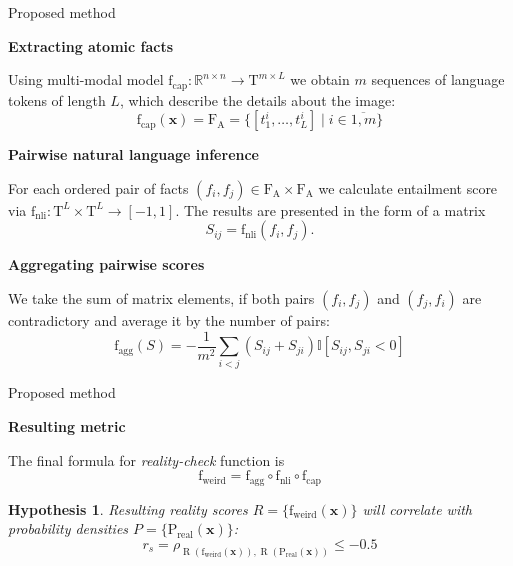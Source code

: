 \documentclass{beamer}
\newtheorem{hyp}{Hypothesis}
\begin{document}
\begin{frame}{Proposed method}


\textbf{Extracting atomic facts}

Using multi-modal model $\text{f}_\text{cap}: \mathbb{R}^{n\times n} \to \mathrm{T}^{m\times L}$ we obtain $m$ sequences of language tokens of length $L$, which describe the details about the image:
\[\text{f}_\text{cap}(\textbf{x}) = \mathrm{F}_\text{A} = \{[t^i_1, \dots, t^i_L]\;|\; i \in \overline{1, m} \} \]

\textbf{Pairwise natural language inference}

For each ordered pair of facts $(f_i, f_j) \in \mathrm{F}_\text{A} \times \mathrm{F}_\text{A}$ we calculate entailment score via $\text{f}_\text{nli}: \mathrm{T}^{L}\times \mathrm{T}^{L} \to [-1, 1]$.
The results are presented in the form of a matrix
\[S_{ij} = \text{f}_\text{nli}(f_i, f_j). \]

\textbf{Aggregating pairwise scores}

We take the sum of matrix elements, if both pairs $(f_i, f_j)$ and $(f_j, f_i)$ are contradictory and average it by the number of pairs:
\[\text{f}_\text{agg} (S) = - \dfrac{1}{m^2} \sum\limits_{i < j} (S_{ij} + S_{ji}) \mathbb{I} [S_{ij}, S_{ji} < 0] \]

\end{frame}

\begin{frame}{Proposed method}

\textbf{Resulting metric}

The final formula for \textit{reality-check} function is \[\text{f}_\text{weird} = \text{f}_\text{agg} \circ \text{f}_\text{nli} \circ \text{f}_\text{cap}\]

\begin{hyp}
Resulting reality scores $R = \{\text{f}_\text{weird}(\textbf{x})\}$ will correlate with probability densities $P = \{\mathrm{P}_\text{real} (\textbf{x})\}$:
\[\displaystyle r_{s} = \rho _{\operatorname {R} (\text{f}_\text{weird}(\textbf{x})),\operatorname {R} (\mathrm{P}_\text{real} (\textbf{x}))} \le -0.5\]
\end{hyp}
\end{frame}
\end{document}
